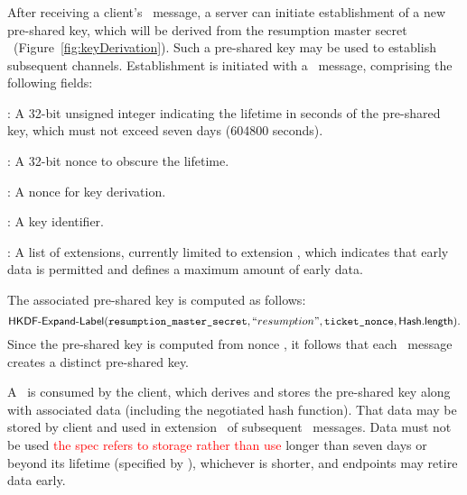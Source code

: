 \subsubsection{\NewSessionTicket}\label{sec:NST}

After receiving a client's \Finished\ message, a server can initiate establishment 
of a new pre-shared key, which will be derived from the resumption master secret
\TLSresumptionMasterSecret\ (Figure~\ref{fig:keyDerivation}). 
Such a pre-shared key may be used to establish subsequent channels. Establishment 
is initiated with a \NewSessionTicket\ message, comprising the following fields:

\begin{description}
\item \TLSticketLifetime: A 32-bit unsigned integer indicating the lifetime 
      in seconds %
      of the pre-shared key, which must not exceed seven days (604800 seconds).

\item \TLSticketAgeAdd: A 32-bit nonce to obscure the lifetime.

\item \TLSticketNonce: A nonce for key derivation.

\item \TLSticket: A key identifier. 

\item \TLSextensions: A list of extensions, currently limited to extension \TLSearlyData, 
  which indicates that early data is permitted and defines a maximum amount 
  of early data.

\end{description}

\begin{sloppypar}
\noindent
The associated pre-shared key is computed as follows:
\[
  \textsf{HKDF-Expand-Label}(\texttt{resumption\_master\_secret}, ``resumption", \texttt{ticket\_nonce}, \textsf{Hash}\textsf{.length}).
\]
Since the pre-shared key is computed from nonce \TLSticketNonce, it follows 
that each \NewSessionTicket\ message creates a distinct pre-shared key.
\end{sloppypar}

A \NewSessionTicket\ is consumed by the client, which derives and stores 
the pre-shared key along with associated data (including the negotiated 
hash function). That data may be stored by client and used in 
extension \TLSpsk\ of subsequent \ClientHello\ messages.
Data must not be used 
\ifSpecNotes
\textcolor{red}{the spec refers to storage rather than use}
\fi
longer than seven days or beyond its lifetime (specified by \TLSticketLifetime), 
whichever is shorter, and endpoints may retire data early.



